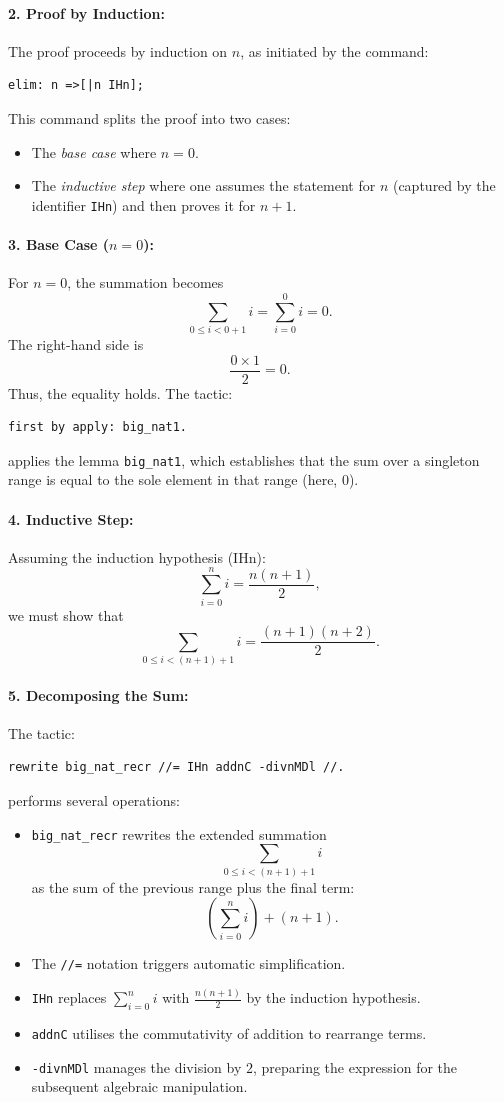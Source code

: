 \documentclass[10pt,nonacm,natbib=false]{acmart}
\begin{document}
\paragraph{2. Proof by Induction:} 
The proof proceeds by induction on \( n \), as initiated by the command:
\begin{verbatim}
elim: n =>[|n IHn];
\end{verbatim}
This command splits the proof into two cases:
\begin{itemize}
    \item The \emph{base case} where \( n = 0 \).
    \item The \emph{inductive step} where one assumes the statement for \( n \) (captured by the identifier \verb|IHn|) and then proves it for \( n+1 \).
\end{itemize}

\paragraph{3. Base Case (\( n = 0 \)):}
For \( n = 0 \), the summation becomes
\[
\sum_{0 \le i < 0+1} i = \sum_{i=0}^{0} i = 0.
\]
The right-hand side is
\[
\frac{0 \times 1}{2} = 0.
\]
Thus, the equality holds. The tactic:
\begin{verbatim}
first by apply: big_nat1.
\end{verbatim}
applies the lemma \texttt{big\_nat1}, which establishes that the sum over a singleton range is equal to the sole element in that range (here, \(0\)).

\paragraph{4. Inductive Step:}
Assuming the induction hypothesis (IHn):
\[
\sum_{i=0}^{n} i = \frac{n(n+1)}{2},
\]
we must show that
\[
\sum_{0 \le i < (n+1)+1} i = \frac{(n+1)(n+2)}{2}.
\]

\paragraph{5. Decomposing the Sum:}
The tactic:
\begin{verbatim}
rewrite big_nat_recr //= IHn addnC -divnMDl //.
\end{verbatim}
performs several operations:
\begin{itemize}
    \item \texttt{big\_nat\_recr} rewrites the extended summation 
    \[
    \sum_{0 \le i < (n+1)+1} i
    \]
    as the sum of the previous range plus the final term:
    \[
    \left(\sum_{i=0}^{n} i\right) + (n+1).
    \]
    \item The \texttt{//=} notation triggers automatic simplification.
    \item \texttt{IHn} replaces \(\sum_{i=0}^{n} i\) with \(\frac{n(n+1)}{2}\) by the induction hypothesis.
    \item \texttt{addnC} utilises the commutativity of addition to rearrange terms.
    \item \texttt{-divnMDl} manages the division by \( 2 \), preparing the expression for the subsequent algebraic manipulation.
\end{itemize}
\end{document}
